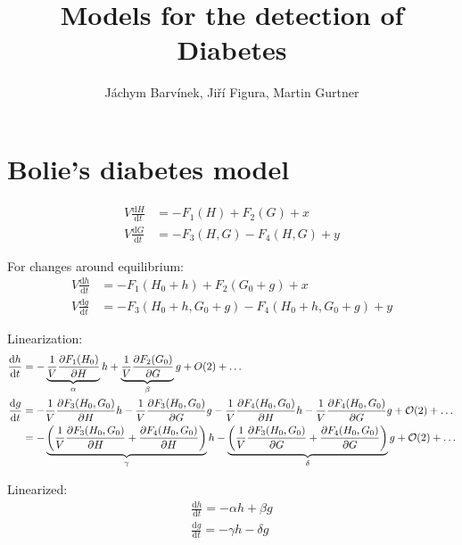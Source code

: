 \documentclass[14pt]{article}
\providecommand{\m}[1]{\ensuremath{\mathrm{#1}}}
\providecommand{\p}[1]{\ensuremath{\partial #1}}
\begin{document}
\title{Models for the detection of Diabetes}
\author{J\'achym Barv\'inek, Ji\v r\'i Figura, Martin Gurtner}

\maketitle



\section{Bolie's diabetes model}


\begin{align}
V\frac{\m{d} H}{\m{d} t}&=-F_1(H)+F_2(G)+ x\\
V\frac{\m{d} G}{\m{d} t}&=-F_3(H,G)-F_4(H,G) + y 
\end{align}

For changes around equilibrium:
\begin{align}
V\frac{\m{d}h}{\m{d}t}&=-F_1(H_0+h)+F_2(G_0+g)+ x\\
V\frac{\m{d}g}{\m{d}t}&=-F_3(H_0+h,G_0+g)-F_4(H_0+h,G_0+g)+ y
\end{align}

Linearization:
\begin{align}
\frac{\m{d}h}{\m{d}t}&=-\underbrace{%
		\frac{1}{V}\frac{\p F_1(H_0)}{\p H}}_{\alpha}h+%
%
\underbrace{%
		\frac{1}{V}\frac{\p F_2(G_0)}{\p G}}_{\beta}g+O(2)+\dots \\%
%
\frac{\m{d}g}{\m{d}t}&=-\frac{1}{V}\frac{\p F_3(H_0, G_0)}{\p H}h- \frac{1}{V}\frac{\p F_3(H_0, G_0)}{\p G}g-\frac{1}{V}\frac{\p F_4(H_0, G_0)}{\p H}h-\frac{1}{V}\frac{\p F_4(H_0, G_0)}{\p G}g+\mathcal{O}(2)+\dots\\%
%
&=-\underbrace{%
\left(\frac{1}{V}\frac{\p F_3(H_0, G_0)}{\p H}+\frac{\p F_4(H_0, G_0)}{\p H}\right)}_{\gamma}h%
-\underbrace{%
\left(\frac{1}{V}\frac{\p F_3(H_0, G_0)}{\p G}+\frac{\p F_4(H_0, G_0)}{\p G}\right)}_{\delta} g+\mathcal{O}(2)+\dots
\end{align}

Linearized:
\begin{align*}
\frac{\m{d}h}{\m{d}t}=-\alpha h + \beta g\\
\frac{\m{d}g}{\m{d}t}=-\gamma h - \delta g\\
\end{align*}
\end{document}
